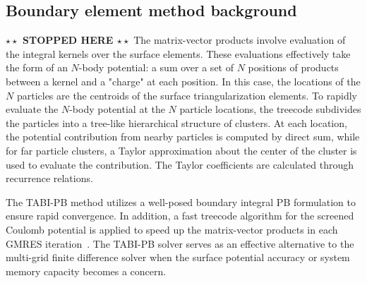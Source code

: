 \documentclass[12pt,titlepage]{article}
\newcommand{\todo}[1]{\textbf{$\star \star$ {#1} $\star \star$}}
\begin{document}
\subsection{Boundary element method background}
\todo{STOPPED HERE}
The matrix-vector products involve evaluation of the integral kernels over the surface elements. These evaluations effectively take the form of an $N$-body potential: a sum over a set of $N$ positions of products between a kernel and a "charge" at each position. In this case, the locations of the $N$ particles are the centroids of the surface triangularization elements. To rapidly evaluate the $N$-body potential at the $N$ particle locations, the treecode subdivides the particles into a tree-like hierarchical structure of clusters. At each location, the potential contribution from nearby particles is computed by direct sum, while for far particle clusters, a Taylor approximation about the center of the cluster is used to evaluate the contribution. The Taylor coefficients are calculated through recurrence relations. 

The TABI-PB method utilizes a well-posed boundary integral PB formulation to ensure rapid convergence. In addition, a fast treecode algorithm for the screened Coulomb potential  is applied to speed up the matrix-vector products in each GMRES iteration~\cite{Juffer1991}. The TABI-PB solver serves as an effective alternative to the multi-grid finite difference solver when the surface potential accuracy or system memory capacity becomes a concern.
\end{document}
